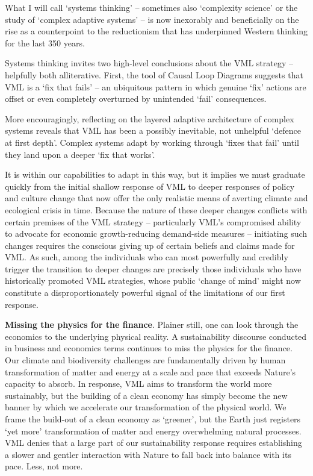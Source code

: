 \documentclass[
]{book}
\begin{document}
What I will call `systems thinking' -- sometimes also `complexity science' or the study of `complex
adaptive systems' -- is now inexorably and beneficially on the rise as a counterpoint to the
reductionism that has underpinned Western thinking for the last 350 years.

Systems thinking invites two high-level conclusions about the VML strategy -- helpfully both
alliterative. First, the tool of Causal Loop Diagrams suggests that VML is a `fix that fails' -- an
ubiquitous pattern in which genuine `fix' actions are offset or even completely overturned by
unintended `fail' consequences.

More encouragingly, reflecting on the layered adaptive architecture of complex systems reveals that
VML has been a possibly inevitable, not unhelpful `defence at first depth'. Complex systems adapt
by working through `fixes that fail' until they land upon a deeper `fix that works'.

It is within our
capabilities to adapt in this way, but it implies we must graduate quickly from the initial shallow
response of VML to deeper responses of policy and culture change that now offer the only realistic
means of averting climate and ecological crisis in time. Because the nature of these deeper changes
conflicts with certain premises of the VML strategy -- particularly VML's compromised ability to
advocate for economic growth-reducing demand-side measures -- initiating such changes requires
the conscious giving up of certain beliefs and claims made for VML. As such, among the individuals
who can most powerfully and credibly trigger the transition to deeper changes are precisely those
individuals who have historically promoted VML strategies, whose public `change of mind' might
now constitute a disproportionately powerful signal of the limitations of our first response.

\textbf{Missing the physics for the finance}.
Plainer still, one can look through the economics to the underlying physical reality. A sustainability
discourse conducted in business and economics terms continues to miss the physics for the finance.
Our climate and biodiversity challenges are fundamentally driven by human transformation of matter
and energy at a scale and pace that exceeds Nature's capacity to absorb. In response, VML aims to
transform the world more sustainably, but the building of a clean economy has simply become the
new banner by which we accelerate our transformation of the physical world. We frame the build-out
of a clean economy as `greener', but the Earth just registers `yet more' transformation of matter and
energy overwhelming natural processes. VML denies that a large part of our sustainability response
requires establishing a slower and gentler interaction with Nature to fall back into balance with its
pace. Less, not more.
\end{document}
